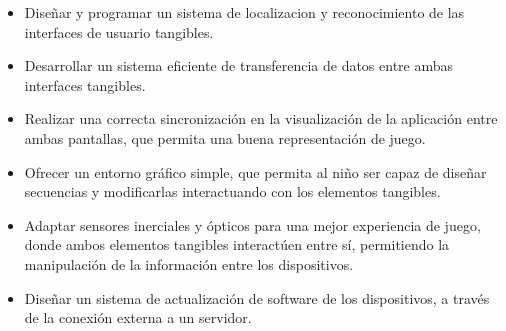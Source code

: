 \begin{itemize}
\item Diseñar y programar un sistema de localizacion y reconocimiento de las interfaces de usuario tangibles.

\item Desarrollar un sistema eficiente de transferencia de datos entre ambas interfaces tangibles.

\item Realizar una correcta sincronización en la visualización de la aplicación entre ambas pantallas, que permita una buena representación de juego.

\item Ofrecer un entorno gráfico simple, que permita al niño ser capaz de diseñar secuencias y modificarlas interactuando con los elementos tangibles.

\item Adaptar sensores inerciales y ópticos para una mejor experiencia de juego, donde ambos elementos tangibles interactúen entre sí, permitiendo la manipulación de la información entre los dispositivos.

\item Diseñar un sistema de actualización de software de los dispositivos, a través de la conexión externa a un servidor.
\end{itemize}



